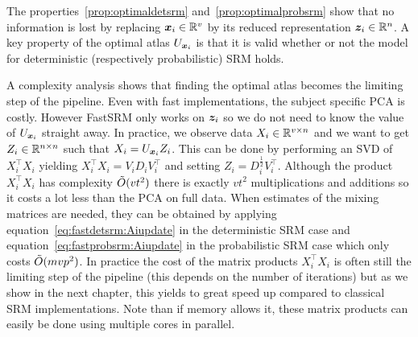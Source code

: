 The properties~\ref{prop:optimaldetsrm} and~\ref{prop:optimalprobsrm} show that
no information is lost by replacing $\boldsymbol{x}_i \in \mathbb{R}^v$ by its reduced representation $\boldsymbol{z}_i \in \mathbb{R}^n$.
A key property of the optimal atlas $U_{\boldsymbol{x}_i}$ is that it is valid whether or
not the model for deterministic (respectively probabilistic) SRM holds.

A complexity analysis shows that finding the optimal atlas becomes the limiting
step of the pipeline. Even with fast implementations, the subject specific PCA
is costly. However FastSRM only works on $\boldsymbol{z}_i$ so we do not need to know the value of $U_{\boldsymbol{x}_i}$ straight away.
In practice, we observe data $X_i \in \mathbb{R}^{v \times n}$ and we want to get $Z_i
\in \mathbb{R}^{n \times n}$ such that $X_i = U_{\boldsymbol{x}_i} Z_i$. This can be done by performing an
SVD of $X_i^{\top} X_i$ yielding $X_i^{\top}X_i= V_i D_i V_i^{\top}$ and setting $Z_i = D_i^{\frac12} V_i^{\top}$.
Although the product $X_i^{\top} X_i$ has complexity $\tilde{O}(vt^2)$ there is
exactly $vt^2$ multiplications and additions so it costs a lot less than the PCA
on full data. When estimates of the mixing matrices are needed, they can be obtained by
applying equation~\eqref{eq:fastdetsrm:Aiupdate} in the deterministic SRM case and
equation~\eqref{eq:fastprobsrm:Aiupdate} in the probabilistic SRM case which only costs
$\tilde{O}(mvp^2)$.
In practice the cost of the matrix products $X_i^{\top} X_i$ is often still the
limiting step of the pipeline (this depends on the number of iterations) but as
we show in the next chapter, this yields to great speed up compared to classical
SRM implementations. Note than if memory allows it, these matrix products can easily be done using multiple cores in parallel.



